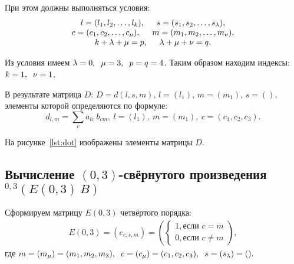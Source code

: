 При этом должны выполняться условия:
\[
  \begin{array}{lc}
    \begin{matrix}
      l = (l_1, l_2, \dots, l_k), \hspace{5mm} s = (s_1, s_2, \dots, s_{\lambda}), \\
      c = (c_1, c_2, \dots, c_\mu), \hspace{5mm} m = (m_1, m_2, \dots, m_{\nu}), \\
      k + \lambda + \mu = p, \hspace{5mm} \lambda + \mu + \nu = q.
    \end{matrix}
  \end{array}
\]

Из условия имеем $\lambda = 0, \hspace{2mm} \mu = 3, \hspace{2mm} p = q = 4$. Таким образом находим
индексы: $k = 1, \hspace{2mm} \nu = 1$.

В результате матрица $D$: $D = d(l, s, m)$, $l = (l_1)$, $m = (m_1)$, $s = ()$,
элементы которой определяются по формуле:
\begin{equation*}
  d_{l, m} = \sum_{c} a_{lc} \: b_{cm}, \: l = (l_1), \: m = (m_1), \: c = (c_1, c_2, c_3).
\end{equation*}

На рисунке~\ref{lst:dot} изображены элементы матрицы $D$.



\subsection{Вычисление $(0,3)$-свёрнутого произведения ${}^{0, 3}(E(0,3) \: B)$}

Сформируем матрицу $E(0,3)$ четвёртого порядка:
\[
  \begin{array}{lc}
    E(0, 3) = (e_{c,s,m}) = 
    \left(
      \left\{
        \begin{matrix}
          1, \text{если } c = m \\
          0, \text{если } c \ne m
        \end{matrix}
      \right.
    \right),
  \end{array}
\]
где $m = (m_{\mu}) = (m_1, m_2, m_3), \hspace{2mm} c = (c_{\mu}) = (c_1, c_2, c_3), \hspace{2mm} s = (s_{\lambda}) = ().$

